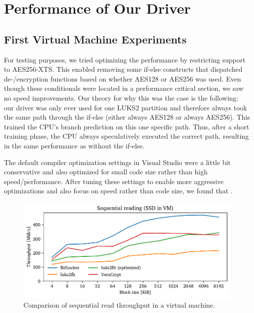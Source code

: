 \chapter{Performance of Our Driver}
\label{chap:performance}

\section{First Virtual Machine Experiments}
\label{chap:performance.firstexperiments}
 For testing purposes, we tried optimizing the performance by restricting support to AES256-XTS. This enabled removing some if-else constructs that dispatched de-/encryption functions based on whether AES128 or AES256 was used. Even though these conditionals were located in a performance critical section, we saw no speed improvements. Our theory for why this was the case is the following: our driver was only ever used for one LUKS2 partition and therefore always took the same path through the if-else (either always AES128 or always AES256). This trained the CPU's branch prediction on this one specific path. Thus, after a short training phase, the CPU always speculatively executed the correct path, resulting in the same performance as without the if-else.

 The default compiler optimization settings in Visual Studio were a little bit conservative and also optimized for small code size rather than high speed/performance. After tuning these settings to enable more aggressive optimizations and also focus on speed rather than code size, we found that .

\begin{figure}[htb!]
	\center
	\includegraphics[scale=1]{../fig/performance.firstexperiments.seq.pdf}
	\caption[
		Comparison of sequential read throughput in a virtual machine
	]{
		Comparison of sequential read throughput in a virtual machine. 
	}
	\label{fig:performance.firstexperiments.rand}
\end{figure}

